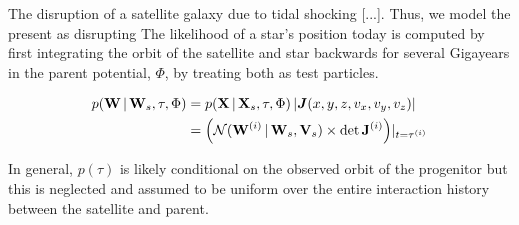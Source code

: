 \documentclass[letterpaper,12pt,preprint]{aastex}
\newcommand{\given}{\,|\,}
\newcommand{\jac}[1]{\left\vert \J{#1} \right\vert}
\newcommand{\D}{{\bf D}}
\newcommand{\W}{{\bf W}}
\newcommand{\X}{{\bf X}}
\newcommand{\V}{{\bf V}}
\newcommand{\J}{{\boldsymbol J}}
\newcommand{\bSigma}{{\bf \Sigma}}
\newcommand{\bsigma}{\boldsymbol\sigma}
\begin{document}
The disruption of a satellite galaxy due to tidal shocking [...]. Thus, we model the present as disrupting The likelihood of a star's position today is computed by first integrating the orbit of the satellite and star backwards for several Gigayears in the parent potential, $\Phi$, by treating both as test particles. 

\begin{align}
	p(\W \given \W_s, \tau, \Phi) &= p(\X \given \X_s, \tau, \Phi) \jac{(x,y,z,v_x,v_y,v_z)}\\
	&= \left(\mathcal{N}(\W^{(i)} \given \W_s, \V_s) \times \det{\bf J}^{(i)}\right)\rvert_{t=\tau^{(i)}}
\end{align}


In general, $p(\tau)$ is likely conditional on the observed orbit of the progenitor but this is neglected and assumed to be uniform over the entire interaction history between the satellite and parent.





\end{document}
